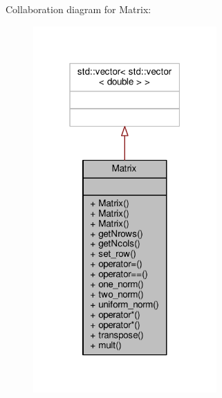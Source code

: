 Collaboration diagram for Matrix\+:
\nopagebreak
\begin{figure}[H]
\begin{center}
\leavevmode
\includegraphics[width=199pt]{classMatrix__coll__graph}
\end{center}
\end{figure}
